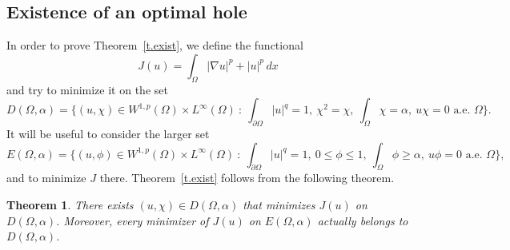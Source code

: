 \documentclass[11pt]{amsart}
\newtheorem{theorem}{Theorem}[section]
\theoremstyle{remark}
\numberwithin{equation}{section}
\begin{document}
\subsection{Existence of an optimal hole}
In order to prove Theorem~\ref{t.exist}, we define the functional
\[
J(u)=\int_\Omega|\nabla u|^p+|u|^p\,dx
\]
and try to minimize it on the set
\[
D(\Omega,\alpha)=\Big\{(u,\chi)\in W^{1,p}(\Omega)\times L^\infty(\Omega)\ :\ \int_{\partial\Omega}|u|^q=1,\ \chi^2=\chi,\ \int_\Omega\chi=\alpha,\ u\chi=0 \text{ a.e. }\Omega\Big\}.
\]
It will be useful to consider the larger set
\[
E(\Omega,\alpha)=\Big\{(u,\phi)\in W^{1,p}(\Omega)\times L^\infty(\Omega)\ :\ \int_{\partial\Omega}|u|^q=1,\ 0\le\phi\le1,\ \int_\Omega\phi\ge\alpha,\ u\phi=0 \text{ a.e. }\Omega\Big\},
\]
and to minimize $J$ there. Theorem~\ref{t.exist} follows from the following theorem.

\begin{theorem}\label{t.DE}
There exists $(u,\chi)\in D(\Omega,\alpha)$ that minimizes $J(u)$ on $D(\Omega,\alpha)$. Moreover, every minimizer of $J(u)$ on $E(\Omega,\alpha)$ actually belongs to $D(\Omega,\alpha)$.
\end{theorem}
\end{document}
